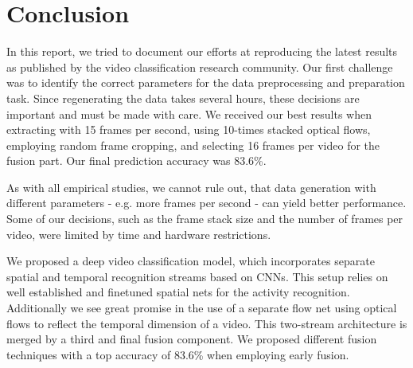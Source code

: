 \section{Conclusion}
\label{sec:conclusion}

In this report, we tried to document our efforts at reproducing the latest results as published by the video classification research community.
Our first challenge was to identify the correct parameters for the data preprocessing and preparation task.
Since regenerating the data takes several hours, these decisions are important and must be made with care.
We received our best results when extracting with 15 frames per second, using 10-times stacked optical flows, employing random frame cropping, and selecting 16 frames per video for the fusion part.
Our final prediction accuracy was 83.6\%.

As with all empirical studies, we cannot rule out, that data generation with different parameters - e.g. more frames per second - can yield better performance.
Some of our decisions, such as the frame stack size and the number of frames per video, were limited by time and hardware restrictions.

We proposed a deep video classification model, which incorporates separate spatial and temporal recognition streams based on CNNs.
This setup relies on well established and finetuned spatial nets for the activity recognition.
Additionally we see great promise in the use of a separate flow net using optical flows to reflect the temporal dimension of a video.
This two-stream architecture is merged by a third and final fusion component.
We proposed different fusion techniques with a top accuracy of 83.6\% when employing early fusion.


